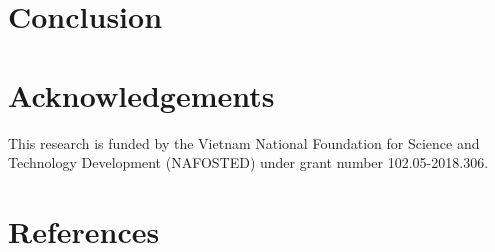 \documentclass[review]{elsarticle}
\begin{document}
\linenumbers







\section{Conclusion}
\label{sec:conclusion}
\section*{Acknowledgements}
This research is funded by the Vietnam National Foundation for Science and Technology Development (NAFOSTED) under grant number 102.05-2018.306.
\section*{References}


\end{document}
